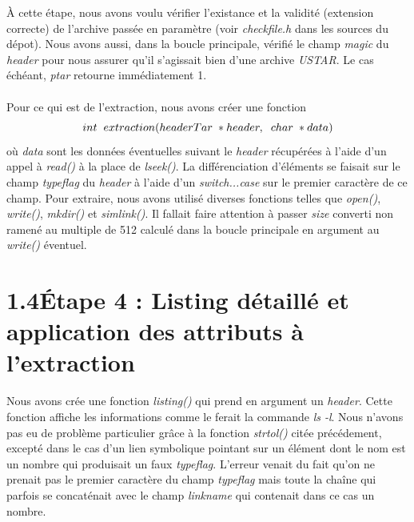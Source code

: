 \documentclass[12pt, a4paper]{report}
\begin{document}
\hspace{0.5cm}À cette étape, nous avons voulu vérifier l'existance et la validité (extension correcte) de l'archive passée en paramètre (voir \textit{checkfile.h} dans les sources du dépot). Nous avons aussi, dans la boucle principale, vérifié le champ \textit{magic} du \textit{header} pour nous assurer qu'il s'agissait bien d'une archive \textit{USTAR}. Le cas échéant, \textit{ptar} retourne immédiatement 1.\\
\\

\hspace{0.5cm}Pour ce qui est de l'extraction, nous avons créer une fonction \[int\hspace{0.2cm}extraction(headerTar\hspace{0.1cm}*header,\hspace{0.2cm}char\hspace{0.1cm}*data)\] où \textit{data} sont les données éventuelles suivant le \textit{header} récupérées à l'aide d'un appel à \textit{read()} à la place de \textit{lseek()}. La différenciation d'éléments se faisait sur le champ \textit{typeflag} du \textit{header} à l'aide d'un \textit{switch...case} sur le premier caractère de ce champ. Pour extraire, nous avons utilisé diverses fonctions telles que \textit{open()}, \textit{write()}, \textit{mkdir()} et \textit{simlink()}. Il fallait faire attention à passer \textit{size} converti non ramené au multiple de 512 calculé dans la boucle principale en argument au \textit{write()} éventuel.

\section*{\hspace{0.6cm}1.4\hspace{0.6cm}Étape 4 : Listing détaillé et application des attributs à l'extraction}
\hspace{1cm}Nous avons crée une fonction \textit{listing()} qui prend en argument un \textit{header}. Cette fonction affiche les informations comme le ferait la commande \textit{ls -l}. Nous n'avons pas eu de problème particulier grâce à la fonction \textit{strtol()} citée précédement, excepté dans le cas d'un lien symbolique pointant sur un élément dont le nom est un nombre qui produisait un faux \textit{typeflag}. L'erreur venait du fait qu'on ne prenait pas le premier caractère du champ \textit{typeflag} mais toute la chaîne qui parfois se concaténait avec le champ \textit{linkname} qui contenait dans ce cas un nombre.\\
\end{document}
